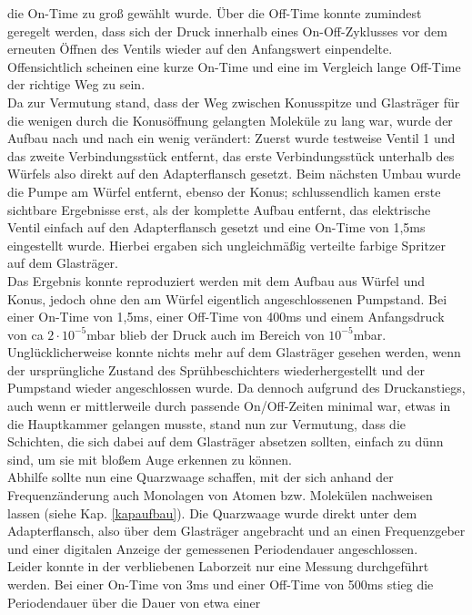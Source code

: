 die On-Time zu groß gewählt wurde. Über die Off-Time konnte zumindest geregelt werden, dass sich der
Druck innerhalb eines On-Off-Zyklusses vor dem erneuten Öffnen des Ventils wieder auf den
Anfangswert einpendelte. Offensichtlich scheinen eine kurze On-Time und eine im Vergleich lange
Off-Time der richtige Weg zu sein.\\
Da zur Vermutung stand, dass der Weg zwischen Konusspitze und Glasträger für die wenigen durch die
Konusöffnung gelangten Moleküle zu lang war, wurde der Aufbau nach und nach ein wenig verändert:
Zuerst wurde testweise Ventil 1 und das zweite Verbindungsstück entfernt, das erste Verbindungsstück
unterhalb des Würfels also direkt auf den Adapterflansch gesetzt. Beim nächsten Umbau wurde die
Pumpe am Würfel entfernt, ebenso der Konus; schlussendlich kamen erste sichtbare Ergebnisse erst,
als der komplette Aufbau entfernt, das elektrische Ventil einfach auf den
Adapterflansch gesetzt und eine On-Time von 1,5ms eingestellt wurde. Hierbei ergaben sich
ungleichmäßig verteilte farbige Spritzer auf dem Glasträger.\\
Das Ergebnis konnte reproduziert werden mit dem Aufbau aus Würfel und Konus, jedoch ohne den am
Würfel eigentlich angeschlossenen Pumpstand. Bei einer On-Time von 1,5ms, einer Off-Time von
400ms und einem Anfangsdruck von ca $2\cdot10^{-5}$mbar blieb der Druck auch im Bereich von
$10^{-5}$mbar.\\
Unglücklicherweise konnte nichts mehr auf dem Glasträger gesehen werden, wenn der ursprüngliche
Zustand des Sprühbeschichters wiederhergestellt und der Pumpstand wieder angeschlossen wurde. Da
dennoch aufgrund des Druckanstiegs, auch wenn er mittlerweile durch passende On/Off-Zeiten minimal
war, etwas in die Hauptkammer gelangen musste, stand nun zur Vermutung, dass die Schichten, die
sich dabei auf dem Glasträger absetzen sollten, einfach zu dünn sind, um sie mit bloßem Auge
erkennen zu können.\\
Abhilfe sollte nun eine Quarzwaage schaffen, mit der sich anhand der Frequenzänderung auch Monolagen
von Atomen bzw. Molekülen nachweisen lassen (siehe Kap. \ref{kapaufbau}). Die Quarzwaage wurde
direkt unter dem Adapterflansch, also über dem Glasträger angebracht und an einen Frequenzgeber und einer
digitalen Anzeige der gemessenen Periodendauer angeschlossen.\\
Leider konnte in der verbliebenen Laborzeit nur eine Messung durchgeführt werden. Bei einer
On-Time von 3ms und einer Off-Time von 500ms stieg die Periodendauer über die Dauer von etwa einer
